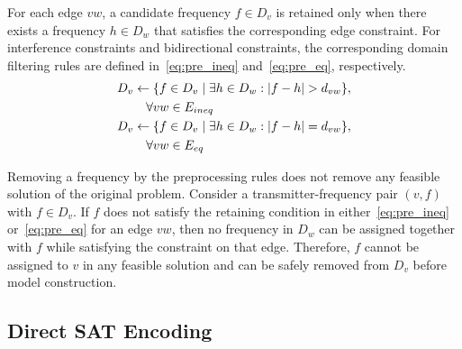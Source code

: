 \documentclass[letterpaper,journal]{IEEEtran}
\begin{document}
For each edge $vw$, a candidate frequency $f \in D_v$ is retained only when there exists a frequency $h \in D_w$ that satisfies the corresponding edge constraint.
For interference constraints and bidirectional constraints, the corresponding domain filtering rules are defined in~\eqref{eq:pre_ineq} and~\eqref{eq:pre_eq}, respectively.
\begin{align}
    D_v &\leftarrow \{ f \in D_v \mid \exists h \in D_w : |f - h| > d_{vw} \},
    \notag \\
    &\quad \forall vw \in E_{ineq} \label{eq:pre_ineq} \\
    D_v &\leftarrow \{ f \in D_v \mid \exists h \in D_w : |f - h| = d_{vw} \},
    \notag \\
    &\quad \forall vw \in E_{eq} \label{eq:pre_eq}
\end{align}
 
Removing a frequency by the preprocessing rules does not remove any feasible solution of the original problem. Consider a transmitter-frequency pair $(v,f)$ with $f \in D_v$. 
If $f$ does not satisfy the retaining condition in either~\eqref{eq:pre_ineq} or~\eqref{eq:pre_eq} for an edge $vw$, then no frequency in $D_w$ can be assigned together with $f$ while satisfying the constraint on that edge. 
Therefore, $f$ cannot be assigned to $v$ in any feasible solution and can be safely removed from $D_v$ before model construction.

\subsection{Direct SAT Encoding}
\label{subsec:sat_encoding}
\end{document}
